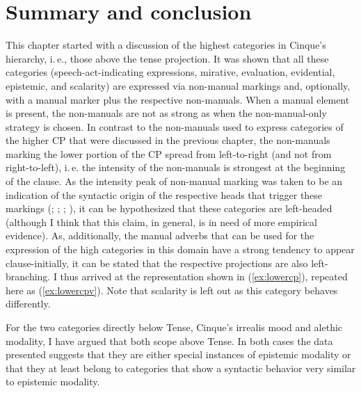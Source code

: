 \section{Summary and conclusion}
This chapter started with a discussion of the highest categories in Cinque's hierarchy, i.\,e., those above the tense projection. It was shown that all these categories (speech-act-indicating expressions, mirative, evaluation, evidential, epistemic, and scalarity) are expressed via non-manual markings and, optionally, with a manual marker plus the respective non-manuals. When a manual element is present, the non-manuals are not as strong as when the non-manual-only strategy is chosen. In contrast to the non-manuals used to express categories of the higher CP that were discussed in the previous chapter, the non-manuals marking the lower portion of the CP spread from left-to-right (and not from right-to-left), i.\,e. the intensity of the non-manuals is strongest at the beginning of the clause. As the intensity peak of non-manual marking was taken to be an indication of the syntactic origin of the respective heads that trigger these markings (\citealt{bahan1996}; \citealt{petronio1997}; \citealt[43--45]{neidle2000syntax}; \citealt[311--312]{sandler2006sign}), it can be hypothesized that these categories are left-headed (although I think that this claim, in general, is in need of more empirical evidence). As, additionally, the manual adverbs that can be used for the expression of the high categories in this domain have a strong tendency to appear clause-initially, it can be stated that the respective projections are also left-branching. I thus arrived at the representation shown in (\ref{ex:lowercp}), repeated here as (\ref{ex:lowercpv}). Note that scalarity is left out as this category behaves differently.


For the two categories directly below Tense, Cinque's irrealis mood and alethic modality, I have argued that both scope above Tense. In both cases the data presented suggests that they are either special instances of epistemic modality or that they at least belong to categories that show a syntactic behavior very similar to epistemic modality.

